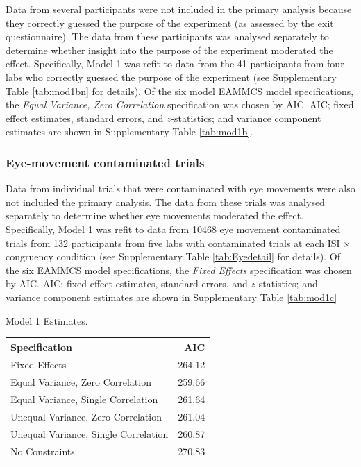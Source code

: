 \documentclass[A4paper,man,floatsintext]{apa6}
\theoremstyle{definition}
\theoremstyle{definition}
\theoremstyle{definition}
\theoremstyle{remark}
\begin{document}
\begin{appendix}
Data from several participants were not included in the primary analysis
because they correctly guessed the purpose of the experiment (as
assessed by the exit questionnaire). The data from these participants
was analysed separately to determine whether insight into the purpose of
the experiment moderated the effect. Specifically, Model 1 was refit to
data from the 41 participants from four labs who correctly guessed the
purpose of the experiment (see Supplementary Table \ref{tab:mod1bn} for
details). Of the six model EAMMCS model specifications, the \emph{Equal
Variance, Zero Correlation} specification was chosen by AIC. AIC; fixed
effect estimates, standard errors, and \(z\)-statistics; and variance
component estimates are shown in Supplementary Table \ref{tab:mod1b}.

\subsubsection{Eye-movement contaminated
trials}\label{eye-movement-contaminated-trials}

Data from individual trials that were contaminated with eye movements
were also not included the primary analysis. The data from these trials
was analysed separately to determine whether eye movements moderated the
effect. Specifically, Model 1 was refit to data from 10468 eye movement
contaminated trials from 132 participants from five labs with
contaminated trials at each ISI \(\times\) congruency condition (see
Supplementary Table \ref{tab:Eyedetail} for details). Of the six EAMMCS
model specifications, the \emph{Fixed Effects} specification was chosen
by AIC. AIC; fixed effect estimates, standard errors, and
\(z\)-statistics; and variance component estimates are shown in
Supplementary Table \ref{tab:mod1c}

\begin{table}[!p]
\caption{\label{tab:mod1}Model 1 Estimates.}
\begin{subtable}{\textwidth}
\centering
\begin{table}[H]\centering\begingroup\fontsize{10}{12}\selectfont

\begin{tabular}{lr}
\toprule
Specification & AIC\\
\midrule
Fixed Effects & 264.12\\
Equal Variance, Zero Correlation & 259.66\\
Equal Variance, Single Correlation & 261.64\\
Unequal Variance, Zero Correlation & 261.04\\
Unequal Variance, Single Correlation & 260.87\\
No Constraints & 270.83\\
\bottomrule
\end{tabular}\endgroup{}
\end{table}
\end{subtable}
\begin{subtable}{\textwidth}
\caption{Fixed Effect Estimates}
\centering
\begin{table}[H]\centering\begingroup\fontsize{10}{12}\selectfont


\end{table}
\end{subtable}
\end{table}
\end{appendix}
\end{document}
